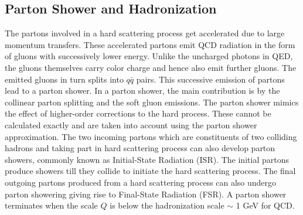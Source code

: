 \subsection{Parton Shower and Hadronization}
The partons involved in a hard scattering process get accelerated due to large momentum transfers. These accelerated partons emit QCD radiation in the form of gluons with successively lower energy. Unlike the uncharged photons in QED, the gluons themselves carry color charge and hence also emit further gluons. The emitted gluons in turn splits into $q\bar{q}$ pairs. This successive emission of partons lead to a parton shower. In a parton shower, the main contribution is by the collinear parton splitting and the soft gluon emissions. The parton shower mimics the effect of higher-order corrections to the hard process. These cannot be calculated exactly and are taken into account using the parton shower approximation. The two incoming partons which are constituents of two colliding hadrons and taking part in hard scattering process can also develop parton showers, commonly known as Initial-State Radiation (ISR). The initial partons produce showers till they collide to initiate the hard scattering process. The final outgoing partons produced from a hard scattering process can also undergo parton showering giving rise to Final-State Radiation (FSR). A parton shower terminates when the scale $Q$ is below the hadronization scale $\sim$ 1 GeV for QCD.

